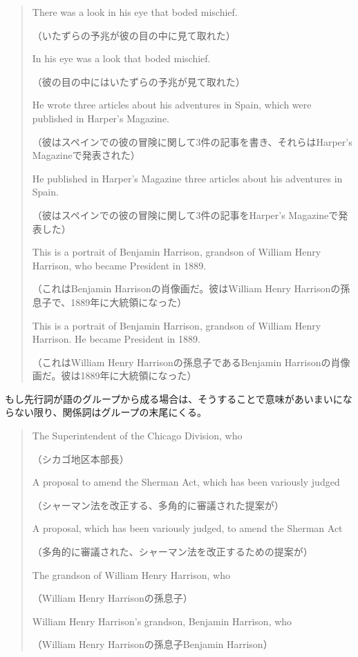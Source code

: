 \begin{quote}
    There was a look in his eye that boded mischief.
    
    （いたずらの予兆が彼の目の中に見て取れた）
    
    In his eye was a look that boded mischief.
    
    （彼の目の中にはいたずらの予兆が見て取れた）
    
    He wrote three articles about his adventures in Spain, which were
published in Harper's Magazine.

（彼はスペインでの彼の冒険に関して3件の記事を書き、それらはHarper's
Magazineで発表された）

He published in Harper's Magazine three articles about his
adventures in Spain.

（彼はスペインでの彼の冒険に関して3件の記事をHarper's
Magazineで発表した）

This is a portrait of Benjamin Harrison, grandson of William Henry
Harrison, who became President in 1889.

（これはBenjamin
Harrisonの肖像画だ。彼はWilliam Henry
Harrisonの孫息子で、1889年に大統領になった）

This is a portrait of Benjamin Harrison, grandson of William Henry
Harrison. He became President in 1889.

（これはWilliam Henry
Harrisonの孫息子であるBenjamin
Harrisonの肖像画だ。彼は1889年に大統領になった）
\end{quote}
もし先行詞が語のグループから成る場合は、そうすることで意味があいまいにならない限り、関係詞はグループの末尾にくる。
\begin{quote}
    The Superintendent of the Chicago Division, who
    
    （シカゴ地区本部長）
    
    A proposal to amend the Sherman Act, which has been variously
judged

（シャーマン法を改正する、多角的に審議された提案が）

A proposal, which has been variously judged, to amend the Sherman
Act

（多角的に審議された、シャーマン法を改正するための提案が）

The grandson of William Henry Harrison, who

（William Henry Harrisonの孫息子）

William Henry Harrison's grandson, Benjamin Harrison, who

（William Henry Harrisonの孫息子Benjamin Harrison）
\end{quote}
